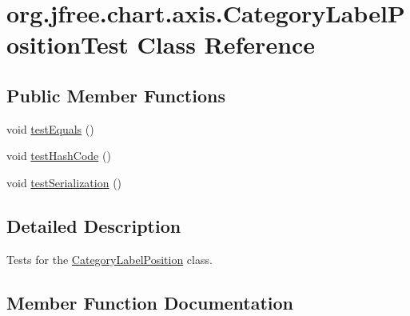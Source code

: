 \hypertarget{classorg_1_1jfree_1_1chart_1_1axis_1_1_category_label_position_test}{}\section{org.\+jfree.\+chart.\+axis.\+Category\+Label\+Position\+Test Class Reference}
\label{classorg_1_1jfree_1_1chart_1_1axis_1_1_category_label_position_test}
\subsection*{Public Member Functions}
\begin{DoxyCompactItemize}
\item 
void \mbox{\hyperlink{classorg_1_1jfree_1_1chart_1_1axis_1_1_category_label_position_test_a76b698c2ae85dc6526881b6cddda954c}{test\+Equals}} ()
\item 
void \mbox{\hyperlink{classorg_1_1jfree_1_1chart_1_1axis_1_1_category_label_position_test_acc2b2909fb69e206c2112e85a480afeb}{test\+Hash\+Code}} ()
\item 
void \mbox{\hyperlink{classorg_1_1jfree_1_1chart_1_1axis_1_1_category_label_position_test_a8ff7bf276b7dd4a4bb4eee45ae9b2882}{test\+Serialization}} ()
\end{DoxyCompactItemize}


\subsection{Detailed Description}
Tests for the \mbox{\hyperlink{classorg_1_1jfree_1_1chart_1_1axis_1_1_category_label_position}{Category\+Label\+Position}} class. 

\subsection{Member Function Documentation}
\mbox{\label{classorg_1_1jfree_1_1chart_1_1axis_1_1_category_label_position_test_a76b698c2ae85dc6526881b6cddda954c}} 

